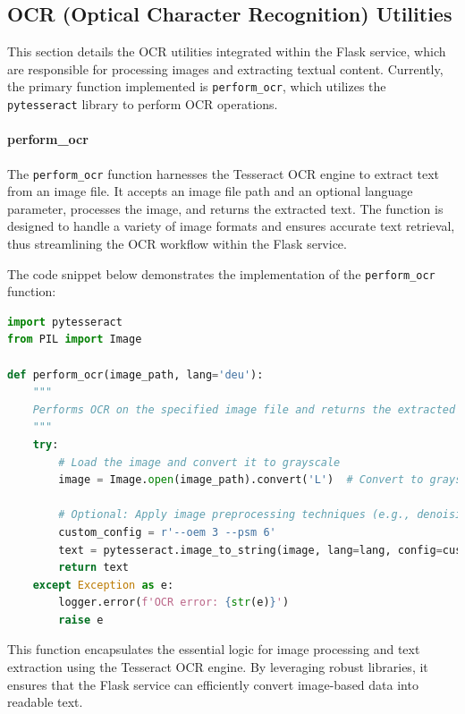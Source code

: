 \subsection{OCR (Optical Character Recognition) Utilities}

This section details the OCR utilities integrated within the Flask service, which are responsible for processing images and extracting textual content. Currently, the primary function implemented is \texttt{perform\_ocr}, which utilizes the \texttt{pytesseract} library to perform OCR operations.

\paragraph{perform\_ocr}

The \texttt{perform\_ocr} function harnesses the Tesseract OCR engine to extract text from an image file. It accepts an image file path and an optional language parameter, processes the image, and returns the extracted text. The function is designed to handle a variety of image formats and ensures accurate text retrieval, thus streamlining the OCR workflow within the Flask service.

The code snippet below demonstrates the implementation of the \texttt{perform\_ocr} function:

\begin{lstlisting}[language=Python, caption={perform\_ocr Utility Function}]
import pytesseract
from PIL import Image

def perform_ocr(image_path, lang='deu'):
    """
    Performs OCR on the specified image file and returns the extracted text.
    """
    try:
        # Load the image and convert it to grayscale
        image = Image.open(image_path).convert('L')  # Convert to grayscale

        # Optional: Apply image preprocessing techniques (e.g., denoising, thresholding, etc.)
        custom_config = r'--oem 3 --psm 6'
        text = pytesseract.image_to_string(image, lang=lang, config=custom_config)
        return text
    except Exception as e:
        logger.error(f'OCR error: {str(e)}')
        raise e
\end{lstlisting}

This function encapsulates the essential logic for image processing and text extraction using the Tesseract OCR engine. By leveraging robust libraries, it ensures that the Flask service can efficiently convert image-based data into readable text.

